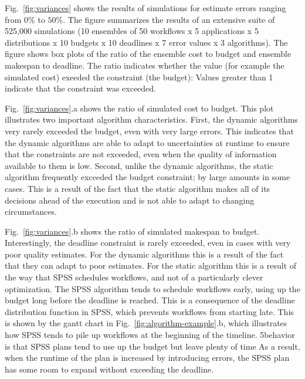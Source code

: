 \documentclass[conference]{IEEEtran}
\begin{document}
Fig.~\ref{fig:variances} shows the results of simulations for estimate errors
ranging from $0\%$ to $50\%$. The figure summarizes the results of an
extensive suite of 525,000 simulations (10 ensembles of 50 workflows x 5
applications x 5 distributions x 10 budgets x 10 deadlines x 7 error values x
3 algorithms). The figure shows box plots of the ratio of the ensemble cost to
budget and ensemble makespan to deadline. The ratio indicates whether the value (for example the simulated cost) exeeded the constraint (the budget): Values
greater than 1 indicate that the constraint was exceeded.

Fig.~\ref{fig:variances}.a shows the ratio of simulated cost to budget. This
plot illustrates two important algorithm characteristics. First, the dynamic
algorithms very rarely exceeded the budget, even with very large errors. This
indicates that the dynamic algorithms are able to adapt to uncertainties at
runtime to ensure that the constraints are not exceeded, even when the quality
of information available to them is low. Second, unlike the dynamic
algorithms, the static algorithm frequently exceeded the budget constraint; by
large amounts in some cases. This is a result of the fact that the static
algorithm makes all of its decisions ahead of the execution and is not able to adapt
to changing circumstances.


Fig.~\ref{fig:variances}.b shows the ratio of simulated makespan to budget. 
Interestingly, the deadline constraint is rarely exceeded, even in cases with
very poor quality estimates. For the dynamic algorithms this is a result of
the fact that they can adapt to poor estimates. For the static algorithm this
is a result of the way that SPSS schedules workflows, and not of a
particularly clever optimization. The SPSS algorithm tends to schedule
workflows early, using up the budget long before the deadline is reached. This
is a consequence of the deadline distribution function in SPSS, which prevents
workflows from starting late. This is shown by the gantt chart in
Fig.~\ref{fig:algorithm-example}.b, which illustrates how SPSS tends to pile
up workflows at the beginning of the timeline. 
5behavior is that SPSS plans tend to use up the budget but leave plenty of time
As a result, when the runtime of the plan is increased by
introducing errors, the SPSS plan has some room to expand without exceeding
the deadline.
\end{document}
